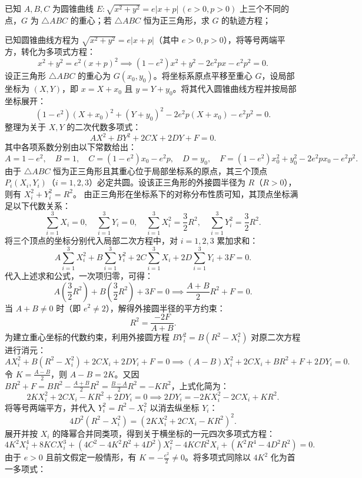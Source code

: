 \begin{example}
已知 $A, B, C$ 为圆锥曲线 \(E: \sqrt{x^2 + y^2} = e|x + p|\ (e > 0, p > 0)\) 上三个不同的点，\(G\) 为 \(\triangle ABC\) 的重心；若 \(\triangle ABC\) 恒为正三角形，求 \(G\) 的轨迹方程；
\end{example}
\begin{solution}
已知圆锥曲线方程为 $\sqrt{x^2 + y^2} = e|x + p|$（其中 $e > 0, p > 0$），将等号两端平方，转化为多项式方程：
\[
x^2 + y^2 = e^2(x + p)^2 \implies (1-e^2)x^2 + y^2 - 2e^2 p x - e^2 p^2 = 0.
\]
设正三角形 $\triangle ABC$ 的重心为 $G(x_0, y_0)$。将坐标系原点平移至重心 $G$，设局部坐标为 $(X, Y)$，即 $x = X + x_0$ 且 $y = Y + y_0$。将其代入圆锥曲线方程并按局部坐标展开：
\[
(1-e^2)(X+x_0)^2 + (Y+y_0)^2 - 2e^2 p(X+x_0) - e^2 p^2 = 0.
\]
整理为关于 $X, Y$ 的二次代数多项式：
\[
A X^2 + B Y^2 + 2CX + 2DY + F = 0.
\]
其中各项系数分别由以下常数给出：
\[
A = 1-e^2, \quad B = 1, \quad C = (1-e^2)x_0 - e^2 p, \quad D = y_0, \quad F = (1-e^2)x_0^2 + y_0^2 - 2e^2 p x_0 - e^2 p^2.
\]
由于 $\triangle ABC$ 恒为正三角形且其重心位于局部坐标系的原点，其三个顶点 $P_i(X_i, Y_i)$（$i=1,2,3$）必定共圆。设该正三角形的外接圆半径为 $R$（$R>0$），则有 $X_i^2 + Y_i^2 = R^2$。
由正三角形在坐标系下的对称分布性质可知，其顶点坐标满足以下代数关系：
\[
\sum_{i=1}^3 X_i = 0, \quad \sum_{i=1}^3 Y_i = 0, \quad \sum_{i=1}^3 X_i^2 = \frac{3}{2}R^2, \quad \sum_{i=1}^3 Y_i^2 = \frac{3}{2}R^2.
\]
将三个顶点的坐标分别代入局部二次方程中，对 $i=1,2,3$ 累加求和：
\[
A \sum_{i=1}^3 X_i^2 + B \sum_{i=1}^3 Y_i^2 + 2C \sum_{i=1}^3 X_i + 2D \sum_{i=1}^3 Y_i + 3F = 0.
\]
代入上述求和公式，一次项归零，可得：
\[
A \left(\frac{3}{2}R^2\right) + B \left(\frac{3}{2}R^2\right) + 3F = 0 \implies \frac{A+B}{2} R^2 + F = 0.
\]
当 $A+B \neq 0$ 时（即 $e^2 \neq 2$），解得外接圆半径的平方约束：
\[
R^2 = \frac{-2F}{A+B}.
\]
为建立重心坐标的代数约束，利用外接圆方程 $B Y_i^2 = B(R^2 - X_i^2)$ 对原二次方程进行消元：
\[
A X_i^2 + B(R^2 - X_i^2) + 2CX_i + 2DY_i + F = 0 \implies (A-B)X_i^2 + 2CX_i + BR^2 + F + 2DY_i = 0.
\]
令 $K = \frac{A-B}{2}$，则 $A-B = 2K$。又因 $BR^2 + F = BR^2 - \frac{A+B}{2}R^2 = \frac{B-A}{2}R^2 = -KR^2$，上式化简为：
\[
2KX_i^2 + 2CX_i - KR^2 + 2DY_i = 0 \implies 2DY_i = -2KX_i^2 - 2CX_i + KR^2.
\]
将等号两端平方，并代入 $Y_i^2 = R^2 - X_i^2$ 以消去纵坐标 $Y_i$：
\[
4D^2 (R^2 - X_i^2) = (2KX_i^2 + 2CX_i - KR^2)^2.
\]
展开并按 $X_i$ 的降幂合并同类项，得到关于横坐标的一元四次多项式方程：
\[
4K^2 X_i^4 + 8KC X_i^3 + (4C^2 - 4K^2 R^2 + 4D^2)X_i^2 - 4KC R^2 X_i + (K^2 R^4 - 4D^2 R^2) = 0.
\]
由于 $e>0$ 且前文假定一般情形，有 $K = -\frac{e^2}{2} \neq 0$。将多项式同除以 $4K^2$ 化为首一多项式：

\end{solution}
